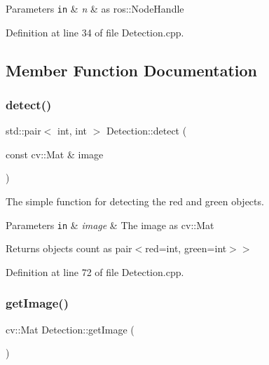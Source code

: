 \begin{DoxyParams}[1]{Parameters}
\mbox{\tt in}  & {\em n} & as ros\+::\+Node\+Handle \\
\hline
\end{DoxyParams}


Definition at line 34 of file Detection.\+cpp.



\subsection{Member Function Documentation}
\mbox{\label{class_detection_a8a2edcc8953e1497993d06ab51d36e64}} 
\subsubsection{\texorpdfstring{detect()}{detect()}}
{\footnotesize\ttfamily std\+::pair$<$ int, int $>$ Detection\+::detect (\begin{DoxyParamCaption}\item[{const cv\+::\+Mat \&}]{image }\end{DoxyParamCaption})}



The simple function for detecting the red and green objects. 


\begin{DoxyParams}[1]{Parameters}
\mbox{\tt in}  & {\em image} & The image as cv\+::\+Mat\\
\hline
\end{DoxyParams}
\begin{DoxyReturn}{Returns}
objects count as pair$<$red=int, green=int$>$$>$ 
\end{DoxyReturn}


Definition at line 72 of file Detection.\+cpp.

\mbox{\label{class_detection_a8b1151044c2c6bc28c2aeacb808cfd4d}} 
\subsubsection{\texorpdfstring{get\+Image()}{getImage()}}
{\footnotesize\ttfamily cv\+::\+Mat Detection\+::get\+Image (\begin{DoxyParamCaption}{ }\end{DoxyParamCaption})}



